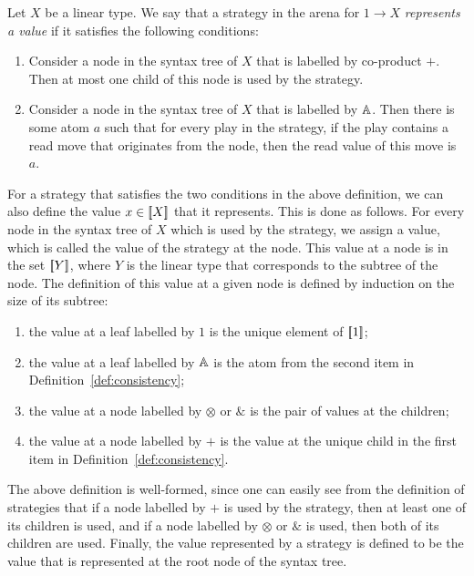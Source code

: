 \begin{definition}\label{def:consistency}
    Let $X$ be a linear type. We say that a  strategy in  the arena for $1 \to X$   \emph{represents a value} if it satisfies the following conditions: 
    \begin{enumerate}
        \item Consider a node in  the syntax tree of $X$ that is labelled by co-product $+$. Then at most one child of this node is  used by the strategy. 
        \item Consider a node  in the syntax tree of $X$ that  is labelled by $\mathbb A$. Then there is some atom $a$ such that for every play in the strategy, if the play contains a read move that originates from the node, then the read value of this move is $a$. 
    \end{enumerate}
\end{definition}

For a strategy that satisfies the two conditions in the above definition, we can also define the value $x \in [{\kern-0.45ex}[X]{\kern-0.45ex}]$ that it represents.  This is done as follows.  For every node  in the syntax tree  of $X$ which is used by the strategy, we assign a value, which is called the value of the strategy at the node. This value at a node is in the set $[{\kern-0.45ex}[Y]{\kern-0.45ex}]$, where $Y$ is the linear type that corresponds to the subtree of the node.  The definition of this value at a given node  is defined by induction on the size of its subtree: 
\begin{enumerate}
    \item the value at a leaf labelled by $1$ is the unique element of $[{\kern-0.45ex}[1]{\kern-0.45ex}]$;
    \item the value at a leaf labelled by $\mathbb A$ is the atom from the second item in Definition~\ref{def:consistency};
    \item the value at a node labelled by $\otimes$ or $\&$ is the pair of values at the children;
    \item the value at a node labelled by $+$ is the value at  the unique child in the first item in Definition~\ref{def:consistency}.
\end{enumerate}
The above definition is well-formed, since one can easily see from the definition of strategies that if a node labelled by $+$ is used by the strategy, then at least one of its children is used, and if a node labelled by $\otimes$ or $\&$ is used, then both of its children are used. Finally, the value represented by a strategy is defined to be the value that is represented at the root node of the syntax tree. 


